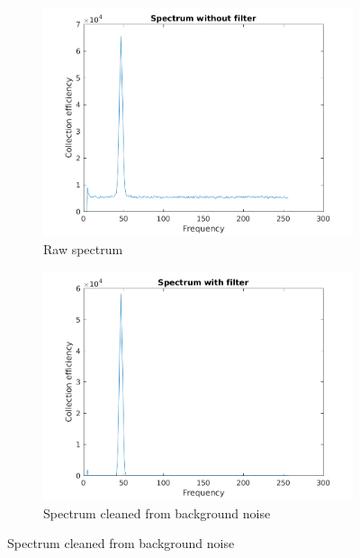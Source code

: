 \documentclass[10pt]{article}
\begin{document}
\begin{figure}[H]
\begin{subfigure}{0.5\textwidth}
  \centering
  \includegraphics[width=1\linewidth]{../Exercises_and_Tasks/ex1/figures/spectra_nofilter.png}
  \caption{Raw spectrum}
  \label{fig:raw_spectrum}
\end{subfigure}
\begin{subfigure}{0.5\textwidth}
  \centering
  \includegraphics[width=1\linewidth]{../Exercises_and_Tasks/ex1/figures/spectra_noisecancelled.png}
  \caption{Spectrum cleaned from background noise}
    \label{fig:cleaned_spectrum}
\end{subfigure}
\end{figure}
\end{document}

